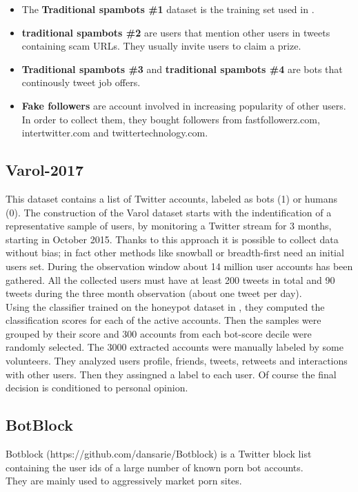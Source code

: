 \begin{itemize}
	\item The \textbf{Traditional spambots \#1} dataset is the training set used in \cite{Yang}.
	\item \textbf{traditional spambots \#2} are users that mention other users in tweets containing scam URLs. They usually invite users to claim a prize.
	\item  \textbf{Traditional spambots \#3} and \textbf{traditional spambots \#4} are bots that continously tweet job offers.
	\item \textbf{Fake followers} are account involved in increasing popularity of other users. In order to collect them, they bought followers from fastfollowerz.com, intertwitter.com and twittertechnology.com. \cite{Cresci}
\end{itemize}


\subsection{Varol-2017}
This dataset contains a list of Twitter accounts, labeled as bots (1) or humans (0). 
The construction of the Varol dataset starts with the indentification of a representative sample of users, by monitoring a Twitter stream for 3 months, starting in October 2015. Thanks to this approach it is possible to collect data without bias; in fact other methods like snowball or breadth-first need an initial users set.
During the observation window about 14 million user accounts has been gathered. 
All the collected users must have at least 200 tweets in total and 90 tweets during the three month observation (about one tweet per day).
\\
Using the classifier trained on the honeypot dataset in \cite{Lee11sevenmonths}, they computed the classification scores for each of the active accounts. 
Then the samples were grouped by their score and 300 accounts from each bot-score decile were randomly selected. 
The 3000 extracted accounts were manually labeled by some volunteers. They analyzed users profile, friends, tweets, retweets and interactions with other users. Then they assingned a label to each user.
Of course the final decision is conditioned to personal opinion\cite{Varol}.

\subsection{BotBlock}
Botblock (https://github.com/dansarie/Botblock) is a Twitter block list containing the user ids of a large number of known porn bot accounts.\\
They are mainly used to aggressively market porn sites.

